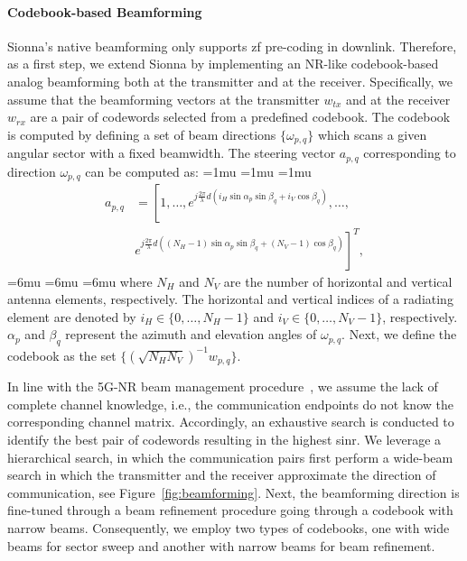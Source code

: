 \paragraph{Codebook-based Beamforming}
Sionna's native beamforming only supports \gls{zf} pre-coding in downlink. Therefore, as a first step, we extend Sionna by implementing an NR-like codebook-based analog beamforming both at the transmitter and at the receiver.
Specifically, we assume that the beamforming vectors at the transmitter $w_{tx}$ and at the receiver $w_{rx}$ are a pair of codewords selected from a predefined codebook. The codebook is computed by defining a set of beam directions $\{ \omega_{p,q} \}$ which scans a given angular sector with a fixed beamwidth. The steering vector $a_{p,q}$ corresponding to direction $\omega_{p, q}$ can be computed as:
\medmuskip=1mu
\thinmuskip=1mu
\thickmuskip=1mu
\begin{equation}
    \begin{aligned}
            a_{p,q} &= \left[ 1,\ldots, e^{j\frac{2\pi}{\lambda}d\left(i_{ H}\sin\alpha_p\sin\beta_q+i_{V}\cos\beta_q\right)}, \ldots,  \right. \\ 
            & \left. e^{j\frac{2\pi}{\lambda}d\left((N_{H}-1)\sin\alpha_p\sin\beta_q + (N_{ V}-1)\cos\beta_q\right)} \right] ^T,
    \end{aligned}
\end{equation}
\medmuskip=6mu
\thinmuskip=6mu
\thickmuskip=6mu
where $N_{H}$ and $N_{V}$ are the number of horizontal and vertical antenna elements, respectively. The horizontal and vertical indices of a radiating element are denoted by $i_{H}\in \{0, \ldots, N_{H} - 1 \}$ and $i_{V}\in \{0, \ldots, N_{V} - 1\}$, respectively. $\alpha_p$ and $\beta_q$ represent the azimuth and elevation angles of $\omega_{p, q}$. Next, we define the codebook as the set $\{ \left( \sqrt{N_{H} N_{V}} \right)^{-1} w_{p, q} \}$. 

In line with the 5G-NR beam management procedure~\cite{giordani2018tutorial}, we assume the lack of complete channel knowledge, i.e., the communication endpoints do not know the corresponding channel matrix. Accordingly, an exhaustive search is conducted to identify the best pair of codewords resulting in the highest \gls{sinr}. We leverage a hierarchical search, in which the communication pairs first perform a wide-beam search
in which the transmitter and the receiver approximate the direction of communication, see Figure~\ref{fig:beamforming}. Next, the beamforming direction is fine-tuned through a beam refinement procedure going through a codebook with narrow beams. Consequently, we employ two types of codebooks, one with wide beams for sector sweep and another with narrow beams for beam refinement.   


